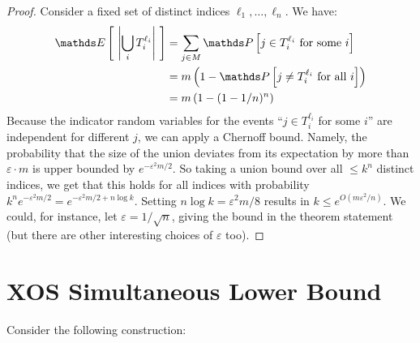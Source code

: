 \begin{proof}
  Consider a fixed set of distinct indices $\ell_1,\ldots, \ell_n$.
  We have: 
  \begin{align*}
    \E{\ \left|\bigcup_iT_i^{\ell_i}\right|\ }
    & = \sum_{j\in M} \P{j\in T_i^{\ell_i}\text{ for some $i$}} \\
    & = m\left(1 - \P{j\ne T_i^{\ell_i}\text{ for all $i$}}\right) \\
    & = m\left(1 - (1-1/n)^n \right) \\
  \end{align*}
  Because the indicator random variables for the events
  ``$j\in T_i^{\ell_i}$ for some $i$'' are independent for different $j$,
  we can apply a Chernoff bound.
  Namely, the probability that the size of the union deviates from 
  its expectation by more than
  $\varepsilon \cdot m$ is upper bounded by $e^{-\varepsilon^2 m/2}$. So taking a
  union bound over all $\leq k^n$ distinct indices, we get that this holds for all
  indices with probability 
  $k^ne^{-\varepsilon^2 m/2} = e^{-\varepsilon^2 m/2 + n\log k}$. Setting $n \log k =
  \varepsilon^2 m/8$ results in $k \leq e^{O(m\varepsilon^2/n)}$. We could, for
  instance, let $\varepsilon = 1/\sqrt{n}$, giving the bound in the theorem
  statement (but there are other interesting choices of $\varepsilon$ too).
  \end{proof}

\section{XOS Simultaneous Lower Bound} 
  Consider the following construction:

